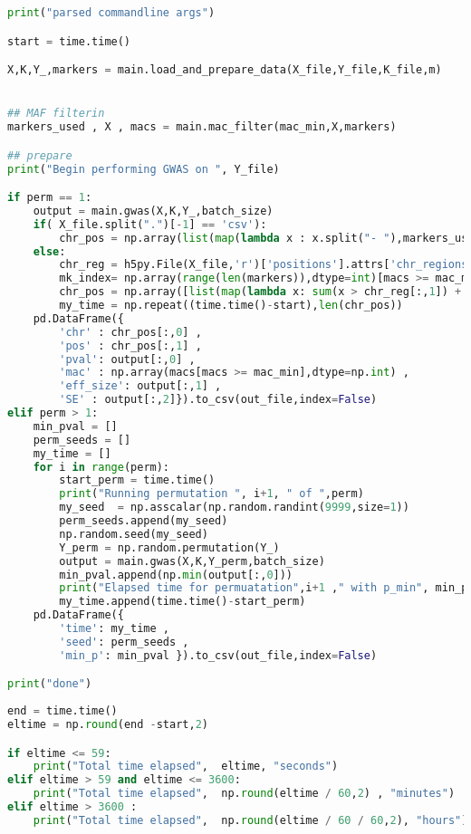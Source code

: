 \begin{lstlisting}[language=Python]
print("parsed commandline args")

start = time.time()

X,K,Y_,markers = main.load_and_prepare_data(X_file,Y_file,K_file,m)


## MAF filterin
markers_used , X , macs = main.mac_filter(mac_min,X,markers)

## prepare
print("Begin performing GWAS on ", Y_file)

if perm == 1:
    output = main.gwas(X,K,Y_,batch_size)   
    if( X_file.split(".")[-1] == 'csv'):
        chr_pos = np.array(list(map(lambda x : x.split("- "),markers_used)))
    else: 
        chr_reg = h5py.File(X_file,'r')['positions'].attrs['chr_regions']
        mk_index= np.array(range(len(markers)),dtype=int)[macs >= mac_min]
        chr_pos = np.array([list(map(lambda x: sum(x > chr_reg[:,1]) + 1, mk_index)), markers_used]).T
        my_time = np.repeat((time.time()-start),len(chr_pos))
    pd.DataFrame({
        'chr' : chr_pos[:,0] ,
        'pos' : chr_pos[:,1] , 
        'pval': output[:,0] ,
        'mac' : np.array(macs[macs >= mac_min],dtype=np.int) ,
        'eff_size': output[:,1] ,
        'SE' : output[:,2]}).to_csv(out_file,index=False)
elif perm > 1:
    min_pval = []
    perm_seeds = []
    my_time = []
    for i in range(perm):
        start_perm = time.time()
        print("Running permutation ", i+1, " of ",perm)
        my_seed  = np.asscalar(np.random.randint(9999,size=1))
        perm_seeds.append(my_seed)
        np.random.seed(my_seed)
        Y_perm = np.random.permutation(Y_)
        output = main.gwas(X,K,Y_perm,batch_size)
        min_pval.append(np.min(output[:,0]))
        print("Elapsed time for permuatation",i+1 ," with p_min", min_pval[i]," is",": ", round(time.time() - start_perm,2))
        my_time.append(time.time()-start_perm)
    pd.DataFrame({
        'time': my_time ,
        'seed': perm_seeds ,
        'min_p': min_pval }).to_csv(out_file,index=False)

print("done")
 
end = time.time()
eltime = np.round(end -start,2)

if eltime <= 59:
    print("Total time elapsed",  eltime, "seconds")
elif eltime > 59 and eltime <= 3600:
    print("Total time elapsed",  np.round(eltime / 60,2) , "minutes")
elif eltime > 3600 :
    print("Total time elapsed",  np.round(eltime / 60 / 60,2), "hours")

  \end{lstlisting}



